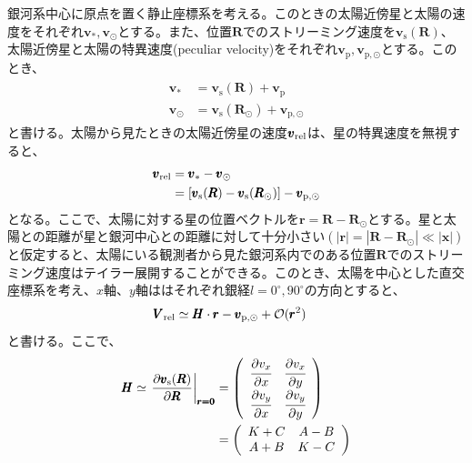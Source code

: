 銀河系中心に原点を置く静止座標系を考える。このときの太陽近傍星と太陽の速度をそれぞれ$\pmb{v}_{*}, \pmb{v}_{\odot}$とする。また、位置$\pmb{R}$でのストリーミング速度を$\pmb{v}_{\mathrm{s}}(\pmb{R})$、太陽近傍星と太陽の特異速度(peculiar velocity)をそれぞれ$\pmb{v}_{\mathrm{p}},\pmb{v}_{\mathrm{p},\odot}$とする。このとき、
\begin{align}
\begin{aligned}
	\pmb{v}_* &= \pmb{v}_{\mathrm{s}}(\pmb{R}) + \pmb{v}_{\mathrm{p}} \\
	\pmb{v}_{\odot} &= \pmb{v}_{\mathrm{s}}(\pmb{R}_{\odot}) + \pmb{v}_{\mathrm{p},\odot}
\end{aligned}
\end{align}
と書ける。太陽から見たときの太陽近傍星の速度$\pmb{v}_{\rm rel}$は、星の特異速度を無視すると、
\begin{align}
\begin{aligned}
	\pmb{v}_{\rm rel} &= \pmb{v}_* - \pmb{v}_{\odot} \\
	&= [\pmb{v}_{\mathrm{s}}(\pmb{R}) - \pmb{v}_{\mathrm{s}}(\pmb{R}_{\odot})] - \pmb{v}_{\mathrm{p},\odot}
\end{aligned}
\end{align}
となる。ここで、太陽に対する星の位置ベクトルを$\pmb{r} = \pmb{R} - \pmb{R}_{\odot}$とする。星と太陽との距離が星と銀河中心との距離に対して十分小さい$(|\pmb{r}| = |\pmb{R}-\pmb{R}_{\odot}| \ll |\pmb{x}|)$と仮定すると、太陽にいる観測者から見た銀河系内でのある位置$\pmb{R}$でのストリーミング速度はテイラー展開することができる。このとき、太陽を中心とした直交座標系を考え、$x$軸、$y$軸ははそれぞれ銀経$l=0^{\circ},90^{\circ}$の方向とすると、
\begin{align}
\begin{aligned}
	\pmb{V}_{\rm rel} &\simeq \pmb{H} \cdot \pmb{r} - \pmb{v}_{\mathrm{p},\odot} + \mathcal{O}(\pmb{r}^2) \label{eq:1}
\end{aligned}
\end{align}
と書ける。ここで、
\begin{align}
\begin{aligned}
	\pmb{H} \simeq
	\left. \frac{\partial \pmb{v}_{\mathrm{s}}(\pmb{R})}{\partial \pmb{R}} \right|_{\pmb{r=0}}
	&=
	\left(
	\begin{array}{cc}
	 	\cfrac{\partial v_x}{\partial x} & \cfrac{\partial v_x}{\partial y}\\
		\cfrac{\partial v_y}{\partial x} & \cfrac{\partial v_y}{\partial y}\\
	\end{array}
	\right) \\
	&=
	\left(
	\begin{array}{cc}
	 	K+C & A-B\\
		A+B & K-C\\
	\end{array}
	\right)
\end{aligned} \label{eq2}
\end{align}
